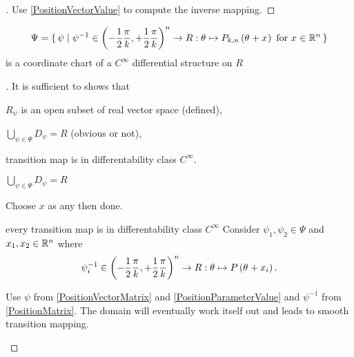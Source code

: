 \documentclass[stu, babel, american, biblatex, a4paper, draftall]{apa7}
\begin{document}
\begin{proof}[]
    \skipped

    Use \cref{PositionVectorValue} to compute the inverse mapping.
\end{proof}
\begin{lemma}\label{CoordinateChart}
    \begin{equation*}
        \Psi=\set{\psi|
            \psi^{-1}
            \in \left(-\frac{1}{2}\frac{\pi}{k},+\frac{1}{2}\frac{\pi}{k}\right)^n \to R
            :\tensor{\theta}{}\mapsto P_{k,n}\left(\tensor{\theta}{}+\tensor{x}{}\right)
            \text{ for }
            \tensor{x}{} \in \real^n
        }
    \end{equation*} is a coordinate chart of a $C^\infty$ differential structure on $R$
\end{lemma}
\begin{proof}[]
    It is sufficient to shows that
    \begin{APAenumerate}
        \item $R_\psi$ is an open subset of real vector space (defined),
        \item $\bigcup_{\psi\in\Psi} D_\psi = R$ (obvious or not),
        \item transition map is in differentability class $C^\infty$.
    \end{APAenumerate}
    \begin{subproof}{$\bigcup_{\psi\in\Psi} D_\psi = R$}
        \skipped

        Choose $x$ as any then done.
    \end{subproof}
    \begin{subproof}{every transition map is in differentability class $C^\infty$}
        Consider $\psi_1, \psi_2 \in \Psi$ and $x_1, x_2 \in \mathbb{R}^n$ where
        \begin{equation*}
            \psi_i^{-1}
            \in \left(-\frac{1}{2}\frac{\pi}{k},+\frac{1}{2}\frac{\pi}{k}\right)^n \to R
            :\tensor{\theta}{}\mapsto P\left(\tensor{\theta}{}+x_i\right)
            \text{.}
        \end{equation*}

        \skipped

        Use $\psi$ from \cref{PositionVectorMatrix} and \cref{PositionParameterValue}
        and $\psi^{-1}$ from \cref{PositionMatrix}.
        The domain will eventually work itself out and leads to smooth transition mapping.
    \end{subproof}
\end{proof}
\end{document}
